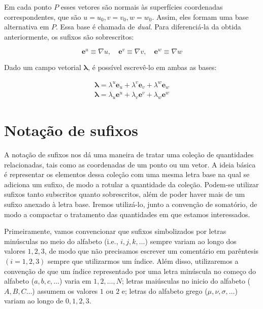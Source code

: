 Em cada ponto $ P $ esses vetores são normais às superfícies coordenadas correspondentes, que são $ u=u_0, v=v_0, w=w_0 $. Assim, eles formam uma base alternativa em $ P $. Essa base é chamada de \textit{dual}. Para diferenciá-la da obtida anteriormente, os sufixos são sobrescritos:

\begin{equation}\label{eq:VetoresDuaisU}
\boxed{\mathbf{e}^{u} \equiv \nabla u, \quad \mathbf{e}^{v} \equiv \nabla v, \quad \mathbf{e}^{w} \equiv \nabla w}
\end{equation} 

Dado um campo vetorial $ \mathbf{\lambda} $, é possível escrevê-lo em ambas as bases:

\begin{equation}\label{eq:LambdaEmAmbasAsBases}
\begin{array}{l}{\boldsymbol{\lambda}=\lambda^{u} \mathbf{e}_{u}+\lambda^{v} \mathbf{e}_{v}+\lambda^{w} \mathbf{e}_{w}} \\ {\boldsymbol{\lambda}=\lambda_{u} \mathbf{e}^{u}+\lambda_{v} \mathbf{e}^{v}+\lambda_{w} \mathbf{e}^{w}}\end{array}
\end{equation}

\section{Notação de sufixos}\label{sec:NotacaoSufixo}
A notação de sufixos nos dá uma maneira de tratar uma coleção de quantidades relacionadas, tais como as coordenadas de um ponto ou um vetor. A ideia básica é representar os elementos dessa coleção com uma mesma letra base na qual se adiciona um sufixo, de modo a rotular a quantidade da coleção. Podem-se utilizar sufixos tanto subscritos quanto sobrescritos, além de poder haver mais de um sufixo anexado à letra base. Iremos utilizá-lo, junto a convenção de somatório, de modo a compactar o tratamento das quantidades em que estamos interessados.

Primeiramente, vamos convencionar que sufixos simbolizados por letras minúsculas no meio do alfabeto (i.e., $i, j, k, \ldots$) sempre variam ao longo dos valores $1, 2, 3$, de modo que não precisamos escrever um comentário em parêntesis $(i=1,2,3)$ sempre que utilizarmos um índice. Além disso, utilizaremos a convenção de que um índice representado por uma letra minúscula no começo do alfabeto ($a,b,c,\ldots$) varia em $1,2,\ldots,N$; letras maiúsculas no inicio do alfabeto ($A,B,C\ldots$) assumem os valores $1$ ou $2$ e; letras do alfabeto grego ($\mu,\nu,\sigma,\ldots$) variam ao longo de $0,1,2,3$.

